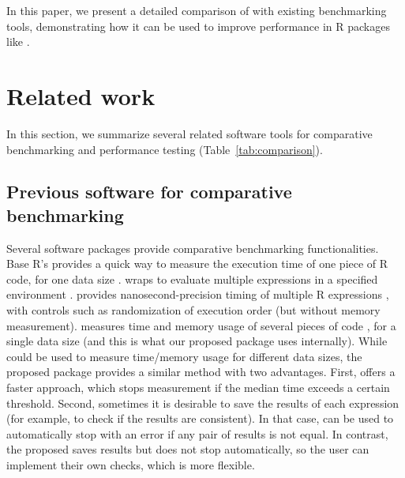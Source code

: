 In this paper, we present a detailed comparison of  with existing benchmarking tools, demonstrating how it can be used to improve performance in R packages like .


\section{Related work}
In this section, we summarize several related software tools for comparative benchmarking and performance testing
(Table~\ref{tab:comparison}).

\subsection{Previous software for comparative benchmarking}

Several software packages provide comparative benchmarking functionalities.
Base R's  provides a quick way to measure the execution time of one piece of R code, for one data size \citep{baseR}. 
 wraps  to evaluate multiple expressions in a specified environment \citep{rbenchmark}.
 provides nanosecond-precision timing of multiple R expressions \citep{microbenchmark}, with controls such as randomization of execution order (but without memory measurement).
 measures time and memory usage of several pieces of code \citep{bench}, for a single data size (and this is what our proposed  package uses internally).
While  could be used to measure time/memory usage for different data sizes, the proposed  package provides a similar method with two advantages.
First,  offers a faster approach, which stops measurement if the median time exceeds a certain threshold. 
Second, sometimes it is desirable to save the results of each expression (for example, to check if the results are consistent).
In that case,  can be used to automatically stop with an error if any pair of results is not equal.
In contrast, the proposed  saves results but does not stop automatically, so the user can implement their own checks, which is more flexible.

